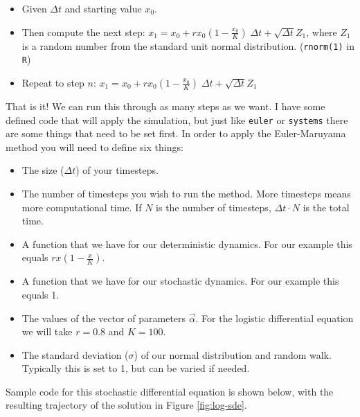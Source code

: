 \documentclass[
]{book}
\providecommand{\tightlist}{%
  \setlength{\itemsep}{0pt}\setlength{\parskip}{0pt}}
\theoremstyle{definition}
\theoremstyle{definition}
\theoremstyle{definition}
\theoremstyle{remark}
\begin{document}
\begin{itemize}
\tightlist
\item
  Given \(\Delta t\) and starting value \(x_{0}\).
\item
  Then compute the next step: \(\displaystyle x_{1} = x_{0} + rx_{0} \left(1 - \frac{x_{0}}{K} \right) \; \Delta t + \sqrt{\Delta t} Z_{1}\), where \(Z_{1}\) is a random number from the standard unit normal distribution. (\texttt{rnorm(1)} in \texttt{R})
\item
  Repeat to step \(n\): \(\displaystyle x_{1} = x_{0} + rx_{0} \left(1 - \frac{x_{0}}{K} \right) \; \Delta t + \sqrt{\Delta t} Z_{1}\)
\end{itemize}

That is it! We can run this through as many steps as we want. I have some defined code that will apply the simulation, but just like \texttt{euler} or \texttt{systems} there are some things that need to be set first. In order to apply the Euler-Maruyama method you will need to define six things:

\begin{itemize}
\tightlist
\item
  The size (\(\Delta t\)) of your timesteps.
\item
  The number of timesteps you wish to run the method. More timesteps means more computational time. If \(N\) is the number of timesteps, \(\Delta t \cdot N\) is the total time.
\item
  A function that we have for our deterministic dynamics. For our example this equals \(\displaystyle rx \left(1 - \frac{x}{K} \right)\).
\item
  A function that we have for our stochastic dynamics. For our example this equals 1.
\item
  The values of the vector of parameters \(\vec{\alpha}\). For the logistic differential equation we will take \(r=0.8\) and \(K=100\).
\item
  The standard deviation (\(\sigma\)) of our normal distribution and random walk. Typically this is set to 1, but can be varied if needed.
\end{itemize}

Sample code for this stochastic differential equation is shown below, with the resulting trajectory of the solution in Figure \ref{fig:log-sde}.
\end{document}
